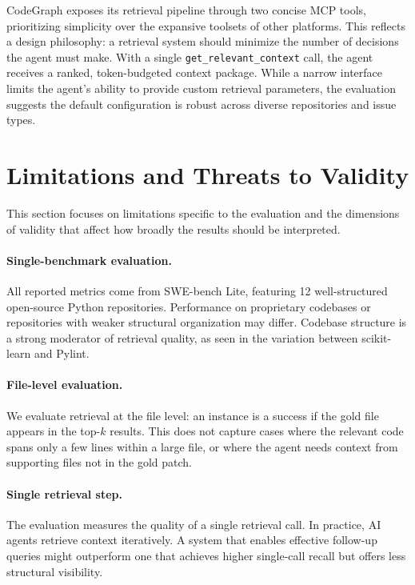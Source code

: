 CodeGraph exposes its retrieval pipeline through two concise MCP tools, prioritizing simplicity over the expansive toolsets of other platforms. This reflects a design philosophy: a retrieval system should minimize the number of decisions the agent must make. With a single \texttt{get\_relevant\_context} call, the agent receives a ranked, token-budgeted context package. While a narrow interface limits the agent's ability to provide custom retrieval parameters, the evaluation suggests the default configuration is robust across diverse repositories and issue types.


\section{Limitations and Threats to Validity}
\label{sec:limitations}

This section focuses on limitations specific to the evaluation and the dimensions of validity that affect how broadly the results should be interpreted.

\paragraph{Single-benchmark evaluation.}
All reported metrics come from SWE-bench Lite, featuring 12 well-structured open-source Python repositories. Performance on proprietary codebases or repositories with weaker structural organization may differ. Codebase structure is a strong moderator of retrieval quality, as seen in the variation between scikit-learn and Pylint.

\paragraph{File-level evaluation.}
We evaluate retrieval at the file level: an instance is a success if the gold file appears in the top-$k$ results. This does not capture cases where the relevant code spans only a few lines within a large file, or where the agent needs context from supporting files not in the gold patch.

\paragraph{Single retrieval step.}
The evaluation measures the quality of a single retrieval call. In practice, AI agents retrieve context iteratively. A system that enables effective follow-up queries might outperform one that achieves higher single-call recall but offers less structural visibility.


